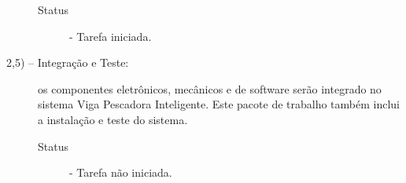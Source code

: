 \begin{description}
\begin{description}
	\item [Status] - Tarefa iniciada.
\end{description} 

\item[2,5) – Integração e Teste:] os componentes eletrônicos, mecânicos e de software serão integrado no sistema Viga Pescadora Inteligente. Este pacote de trabalho também inclui a instalação e teste do sistema.

\begin{description}
	\item [Status] - Tarefa não iniciada. 
\end{description} 

\end{description}


